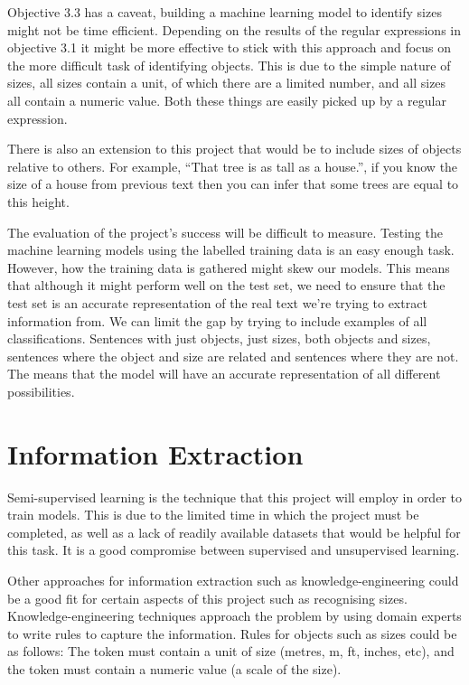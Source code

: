 \documentclass[11pt,oneside]{book}
\begin{document}
Objective 3.3 has a caveat, building a machine learning model to identify sizes might not be time efficient. Depending on the results of the regular expressions in objective 3.1 it might be more effective to stick with this approach and focus on the more difficult task of identifying objects. This is due to the simple nature of sizes, all sizes contain a unit, of which there are a limited number, and all sizes all contain a numeric value. Both these things are easily picked up by a regular expression.

There is also an extension to this project that would be to include sizes of objects relative to others. For example, “That tree is as tall as a house.”, if you know the size of a house from previous text then you can infer that some trees are equal to this height.

The evaluation of the project’s success will be difficult to measure. Testing the machine learning models using the labelled training data is an easy enough task. However, how the training data is gathered might skew our models. This means that although it might perform well on the test set, we need to ensure that the test set is an accurate representation of the real text we’re trying to extract information from. We can limit the gap by trying to include examples of all classifications. Sentences with just objects, just sizes, both objects and sizes, sentences where the object and size are related and sentences where they are not. The means that the model will have an accurate representation of all different possibilities.

\section{Information Extraction}

Semi-supervised learning is the technique that this project will employ in order to train models. This is due to the limited time in which the project must be completed, as well as a lack of readily available datasets that would be helpful for this task. It is a good compromise between supervised and unsupervised learning.

Other approaches for information extraction such as knowledge-engineering could be a good fit for certain aspects of this project such as recognising sizes. Knowledge-engineering techniques approach the problem by using domain experts to write rules to capture the information. Rules for objects such as sizes could be as follows: The token must contain a unit of size (metres, m, ft, inches, etc), and the token must contain a numeric value (a scale of the size).
\end{document}
